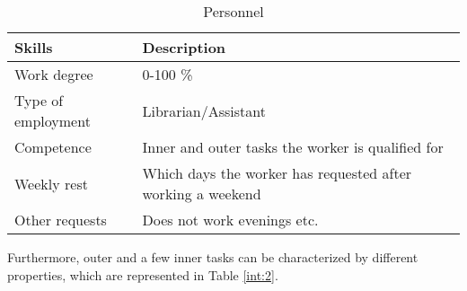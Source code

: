 \begin{table}[h]
\centering
\caption{Personnel}
\label{int:1}
\begin{tabular}{|l|l|}
\hline 
\textbf{Skills} & \textbf{Description} \\ \hline
Work degree & 0-100 \% 
\\ \hline 
Type of employment & Librarian/Assistant
\\ \hline 
Competence & Inner and outer tasks the worker is qualified for  
\\ \hline 
Weekly rest & Which days the worker has requested after working a weekend
\\ \hline 
Other requests & Does not work evenings etc.
\\ \hline 
\end{tabular}
\end{table} 

Furthermore, outer and a few inner tasks can be characterized by different properties, which are represented in Table \ref{int:2}. \\

